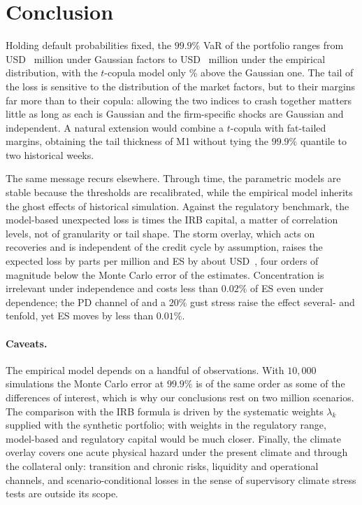 \section{Conclusion}
\label{sec:conclusion}

Holding default probabilities fixed, the $99.9\%$ VaR of the portfolio ranges from USD~ million under Gaussian factors to USD~ million under the empirical distribution, with the $t$-copula model only \% above the Gaussian one. The tail of the loss is sensitive to the distribution of the market factors, but to their margins far more than to their copula: allowing the two indices to crash together matters little as long as each is Gaussian and the firm-specific shocks are Gaussian and independent. A natural extension would combine a $t$-copula with fat-tailed margins, obtaining the tail thickness of M1 without tying the $99.9\%$ quantile to two historical weeks.

The same message recurs elsewhere. Through time, the parametric models are stable because the thresholds are recalibrated, while the empirical model inherits the ghost effects of historical simulation. Against the regulatory benchmark, the model-based unexpected loss is  times the IRB capital, a matter of correlation levels, not of granularity or tail shape. The storm overlay, which acts on recoveries and is independent of the credit cycle by assumption, raises the expected loss by  parts per million and ES by about USD~, four orders of magnitude below the Monte Carlo error of the estimates. Concentration is irrelevant under independence and costs less than $0.02\%$ of ES even under dependence; the PD channel of \citet{Pozdyshev25} and a $20\%$ gust stress raise the effect several- and tenfold, yet ES moves by less than $0.01\%$.

\paragraph{Caveats.}
The empirical model depends on a handful of observations. With $10{,}000$ simulations the Monte Carlo error at $99.9\%$ is of the same order as some of the differences of interest, which is why our conclusions rest on two million scenarios. The comparison with the IRB formula is driven by the systematic weights $\lambda_k$ supplied with the synthetic portfolio; with weights in the regulatory range, model-based and regulatory capital would be much closer. Finally, the climate overlay covers one acute physical hazard under the present climate and through the collateral only: transition and chronic risks, liquidity and operational channels, and scenario-conditional losses in the sense of supervisory climate stress tests are outside its scope.
